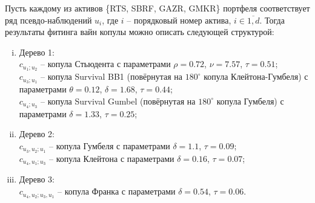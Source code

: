 Пусть каждому из активов \{RTS, SBRF, GAZR, GMKR\} портфеля соответствует ряд псевдо-наблюдений $u_i$, где $i$ -- порядковый номер актива, $i \in \overline{1,d}$. 
Тогда результаты фитинга вайн копулы можно описать следующей структурой:
%
\begin{enumerate}[(i)]
    \item Дерево 1:\\
    $c_{u_1;u_2}$ -- копула Стьюдента с параметрами $\rho=0.72$, $\nu=7.57$, $\tau=0.51$;\\
    $c_{u_3;u_1}$ -- копула Survival BB1 (повёрнутая на $180^{\circ}$ копула Клейтона-Гумбеля) с параметрами $\theta=0.12$, $\delta=1.68$, $\tau=0.44$;\\
    $c_{u_4;u_3}$ -- копула Survival Gumbel (повёрнутая на $180^{\circ}$ копула Гумбеля) с параметрами $\delta=1.33$, $\tau=0.25$;
    \item Дерево 2:\\
    $c_{u_3,u_2;u_1}$ -- копула Гумбеля с параметрами $\delta=1.1$, $\tau=0.09$;\\
    $c_{u_4,u_1;u_3}$ -- копула Клейтона с параметрами $\delta=0.16$, $\tau=0.07$;
    \item Дерево 3:\\
    $c_{u_4,u_2;u_3,u_1}$ -- копула Франка с параметрами $\delta=0.54$, $\tau=0.06$.
\end{enumerate}

